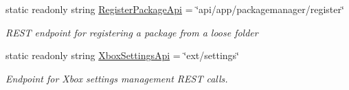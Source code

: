 \begin{DoxyCompactItemize}
static readonly string \hyperlink{class_microsoft_1_1_tools_1_1_windows_device_portal_1_1_device_portal_a4e96c976440b2f52b6f8ebe63b2338b8}{Register\+Package\+Api} = \char`\"{}api/app/packagemanager/register\char`\"{}
\begin{DoxyCompactList}\small\item\em R\+E\+ST endpoint for registering a package from a loose folder \end{DoxyCompactList}\item 
static readonly string \hyperlink{class_microsoft_1_1_tools_1_1_windows_device_portal_1_1_device_portal_a54fa5b85f6df793ed597e78538b357e5}{Xbox\+Settings\+Api} = \char`\"{}ext/settings\char`\"{}
\begin{DoxyCompactList}\small\item\em Endpoint for Xbox settings management R\+E\+ST calls. \end{DoxyCompactList}\end{DoxyCompactItemize}
